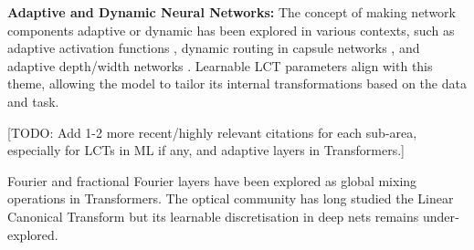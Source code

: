 \textbf{Adaptive and Dynamic Neural Networks:} The concept of making network components adaptive or dynamic has been explored in various contexts, such as adaptive activation functions \citep{ mesela2021dynamic}, dynamic routing in capsule networks \citep{sabour2017dynamic}, and adaptive depth/width networks \citep{NEURIPS2019_0cb929eae}. Learnable LCT parameters align with this theme, allowing the model to tailor its internal transformations based on the data and task.

[TODO: Add 1-2 more recent/highly relevant citations for each sub-area, especially for LCTs in ML if any, and adaptive layers in Transformers.]

Fourier and fractional Fourier layers have been explored as global mixing operations in Transformers\citep{lee2021fnet,chi2022flashfft}.  The optical community has long studied the Linear Canonical Transform\citep{pei1997,chen2009} but its learnable discretisation in deep nets remains under‐explored.